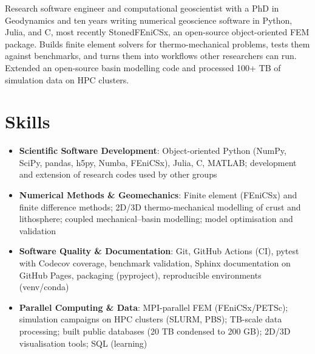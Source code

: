 \documentclass[11pt,a4paper,sans]{moderncv}
\begin{document}
\makecvtitle


\vspace{6pt}
\small{Research software engineer and computational geoscientist with a PhD in Geodynamics and ten years writing numerical geoscience software in Python, Julia, and C, most recently StonedFEniCSx, an open-source object-oriented FEM package. Builds finite element solvers for thermo-mechanical problems, tests them against benchmarks, and turns them into workflows other researchers can run. Extended an open-source basin modelling code and processed 100+ TB of simulation data on HPC clusters.}


\section{Skills}
\vspace{1pt}
\begin{itemize}

\item \textbf{Scientific Software Development}: Object-oriented Python (NumPy, SciPy, pandas, h5py, Numba, FEniCSx), Julia, C, MATLAB; development and extension of research codes used by other groups

\item \textbf{Numerical Methods \& Geomechanics}: Finite element (FEniCSx) and finite difference methods; 2D/3D thermo-mechanical modelling of crust and lithosphere; coupled mechanical--basin modelling; model optimisation and validation

\item \textbf{Software Quality \& Documentation}: Git, GitHub Actions (CI), pytest with Codecov coverage, benchmark validation, Sphinx documentation on GitHub Pages, packaging (pyproject), reproducible environments (venv/conda)

\item \textbf{Parallel Computing \& Data}: MPI-parallel FEM (FEniCSx/PETSc); simulation campaigns on HPC clusters (SLURM, PBS); TB-scale data processing; built public databases (20 TB condensed to 200 GB); 2D/3D visualisation tools; SQL (learning)

\end{itemize}
\end{document}
